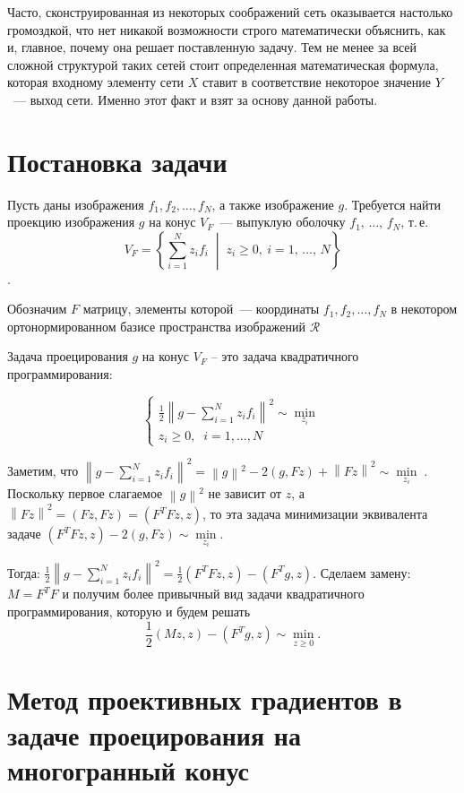 \documentclass[a4paper, 12pt]{article}
\newcommand{\R}{{\mathcal R}}
\newcommand{\norm}[1]{\left\|#1\right\|}
\begin{document}
Часто, сконструированная из некоторых соображений сеть оказывается настолько громоздкой, что нет никакой возможности строго математически объяснить, как и, главное, почему она решает поставленную задачу. Тем не менее за всей сложной структурой таких сетей стоит определенная математическая формула, которая входному элементу сети $X$ ставит в соответствие некоторое значение $Y$ ~--- выход сети. Именно этот факт и взят за основу данной работы.


\section{Постановка задачи}
Пусть даны изображения $f_1, f_2, \ldots, f_N$, а также изображение $g$. Требуется найти проекцию изображения $g$ на конус $V_F$~--- выпуклую оболочку  $f_1,\, \ldots,\, f_N$, т.\,е. 
$$V_F = \left\{ \sum\limits_{i=1}^N z_i f_i \;\middle|\; z_i \geqslant 0,\ i=1,\, \ldots,\, N \right\}$$.

Обозначим $F$ матрицу, элементы которой~--- координаты $f_1, f_2, \ldots, f_N$ в некотором ортонормированном базисе пространства изображений $\R$

Задача проецирования $g$ на конус $V_F$ -- это задача квадратичного программирования:

\begin{equation*}
	\begin{cases}
	\frac{1}{2}\norm{g - \sum\limits_{i=1}^N z_i f_i}^2 \sim 	\min\limits_{z_i} \\
	z_i \geq 0, \;\; i = 1, ..., N
	\end{cases}
\end{equation*}

Заметим, что $\norm{g - \sum\limits_{i=1}^N z_i f_i}^2 = \norm{g}^2 - 2 (g, F z) + \norm{F z}^2 \sim \min\limits_{z_i}\;$. Поскольку первое слагаемое $\norm{g}^2$ не зависит от $z$, а $\norm{Fz}^2 = (Fz,Fz) = (F^T F z, z)$, то эта задача минимизации эквивалента задаче $(F^T F z, z) - 2 (g, F z) \sim \min\limits_{z_i}$.

Тогда: $\frac{1}{2}\norm{g - \sum\limits_{i=1}^N z_i f_i}^2 = \frac{1}{2} (F^T F z, z) - (F^T g, z)$. Сделаем замену: $M = F^T F$ и получим более привычный вид задачи квадратичного программирования, которую и будем решать 
\begin{equation}\label{eq:qua_pro}
\frac{1}{2} (M z, z) - (F^T g, z) \sim \min\limits_{z \geq 0}.
\end{equation}



\section{Метод проективных градиентов в задаче проецирования на многогранный конус}
\end{document}
